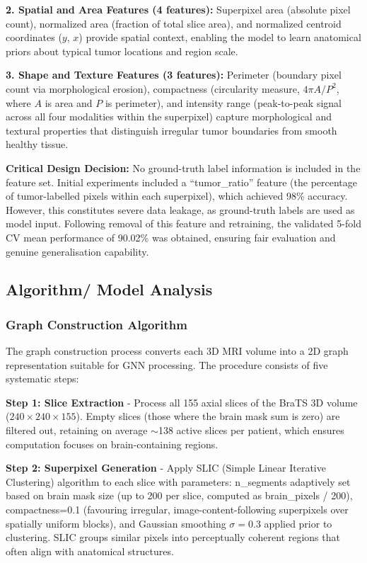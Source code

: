 \textbf{2. Spatial and Area Features (4 features):} Superpixel area (absolute pixel count), normalized area (fraction of total slice area), and normalized centroid coordinates ($y$, $x$) provide spatial context, enabling the model to learn anatomical priors about typical tumor locations and region scale.

\textbf{3. Shape and Texture Features (3 features):} Perimeter (boundary pixel count via morphological erosion), compactness (circularity measure, $4\pi A / P^2$, where $A$ is area and $P$ is perimeter), and intensity range (peak-to-peak signal across all four modalities within the superpixel) capture morphological and textural properties that distinguish irregular tumor boundaries from smooth healthy tissue.

\textbf{Critical Design Decision:} No ground-truth label information is included in the feature set. Initial experiments included a ``tumor\_ratio'' feature (the percentage of tumor-labelled pixels within each superpixel), which achieved 98\% accuracy. However, this constitutes severe data leakage, as ground-truth labels are used as model input. Following removal of this feature and retraining, the validated 5-fold CV mean performance of 90.02\% was obtained, ensuring fair evaluation and genuine generalisation capability.


\subsection{Algorithm/ Model Analysis}

\subsubsection{Graph Construction Algorithm}

The graph construction process converts each 3D MRI volume into a 2D graph representation suitable for GNN processing. The procedure consists of five systematic steps:

\textbf{Step 1: Slice Extraction} - Process all 155 axial slices of the BraTS 3D volume ($240 \times 240 \times 155$). Empty slices (those where the brain mask sum is zero) are filtered out, retaining on average $\sim$138 active slices per patient, which ensures computation focuses on brain-containing regions.

\textbf{Step 2: Superpixel Generation} - Apply SLIC (Simple Linear Iterative Clustering) algorithm to each slice with parameters: n\_segments adaptively set based on brain mask size (up to 200 per slice, computed as brain\_pixels / 200), compactness=0.1 (favouring irregular, image-content-following superpixels over spatially uniform blocks), and Gaussian smoothing $\sigma=0.3$ applied prior to clustering. SLIC groups similar pixels into perceptually coherent regions that often align with anatomical structures.

